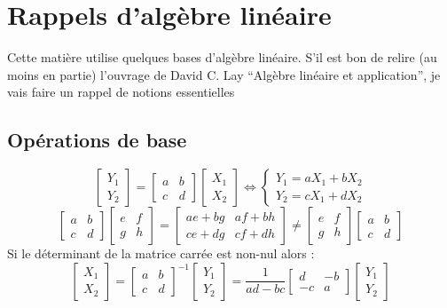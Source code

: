 \documentclass[12pt,a4paper]{article}
\begin{document}
\section{Rappels d'algèbre linéaire}
Cette matière utilise quelques bases d'algèbre linéaire. S'il est bon de relire (au moins en partie) l'ouvrage de David C. Lay ``Algèbre linéaire et application'', je vais faire un rappel de notions essentielles
\subsection{Opérations de base}
\[\begin{bmatrix}
Y_1\\
Y_2
\end{bmatrix} = 
\begin{bmatrix}
	a & b\\
	c & d
\end{bmatrix} \begin{bmatrix}
X_1\\
X_2
\end{bmatrix} \iff \left\{\begin{array}{l}
Y_1 = aX_1 + bX_2\\
Y_2 = cX_1 + dX_2
\end{array}\right.\]
\[\begin{bmatrix}
	a & b\\
	c & d
\end{bmatrix} \begin{bmatrix}
	e & f\\
	g & h
\end{bmatrix} = \begin{bmatrix}
	ae + bg & af+bh\\
	ce + dg & cf + dh
\end{bmatrix} \neq \begin{bmatrix}
	e & f\\
	g & h
\end{bmatrix} \begin{bmatrix}
	a & b\\
	c & d
\end{bmatrix}\]
Si le déterminant de la matrice carrée est non-nul alors :
\[\begin{bmatrix}
X_1\\
X_2
\end{bmatrix} = \begin{bmatrix}
	a & b\\
	c & d
\end{bmatrix}^{-1}\begin{bmatrix}
Y_1\\
Y_2
\end{bmatrix} = \frac{1}{ad-bc}
\begin{bmatrix}
d & -b\\
-c & a
\end{bmatrix}\begin{bmatrix}
Y_1\\
Y_2
\end{bmatrix}\]
\end{document}
